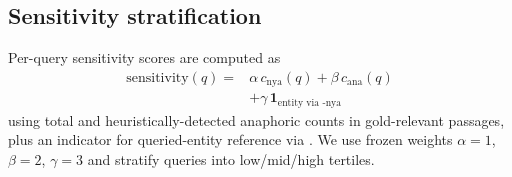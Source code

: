 \subsection{Sensitivity stratification}

Per-query sensitivity scores are computed as
\begin{equation}
\begin{aligned}
\mathrm{sensitivity}(q) ={}& \alpha \, c_{\text{nya}}(q) + \beta \, c_{\text{ana}}(q) \\
&+ \gamma \, \mathbf{1}_{\text{entity via -nya}}
\end{aligned}
\label{eq:sensitivity}
\end{equation}
using total and heuristically-detected anaphoric  counts in gold-relevant passages, plus an indicator for queried-entity reference via . We use frozen weights $\alpha = 1$, $\beta = 2$, $\gamma = 3$ and stratify queries into low/mid/high tertiles.
